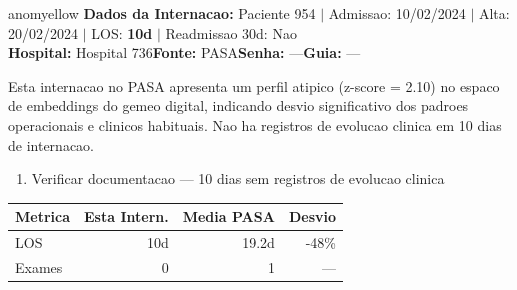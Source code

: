 \documentclass[a4paper,10pt]{article}
\begin{document}
\begin{anomalycard}[Internacao 119574 | PASA | MODERADO (z=2.10)]{anomyellow}
\textbf{Dados da Internacao:} Paciente 954 $\mid$ Admissao: 10/02/2024 $\mid$ Alta: 20/02/2024 $\mid$ LOS: \textbf{10d} $\mid$ Readmissao 30d: Nao\\
\textbf{Hospital:} Hospital 736\quad\textbf{Fonte:} PASA\quad\textbf{Senha:} ---\quad\textbf{Guia:} ---\\
\vspace{2pt}\begin{tcolorbox}[colback=severityred!20,colframe=anomyellow,title={\textbf{Interpretacao de Negocio}},fonttitle=\bfseries\small,left=4pt,right=4pt,top=3pt,bottom=3pt]
{\small Esta internacao no PASA apresenta um perfil atipico (z-score = 2.10) no espaco de embeddings do gemeo digital, indicando desvio significativo dos padroes operacionais e clinicos habituais. Nao ha registros de evolucao clinica em 10 dias de internacao.}
\end{tcolorbox}
\begin{tcolorbox}[colback=severityyellow!30,colframe=anomorange,title={\textbf{Recomendacoes Especificas}},fonttitle=\bfseries\small,left=4pt,right=4pt,top=3pt,bottom=3pt]
\begin{enumerate}[nosep,leftmargin=16pt]
\item {\small Verificar documentacao --- 10 dias sem registros de evolucao clinica}
\end{enumerate}
\end{tcolorbox}
\begin{center}\begin{tabular}{l r r r}\toprule\textbf{Metrica} & \textbf{Esta Intern.} & \textbf{Media PASA} & \textbf{Desvio} \\\midrule
LOS & 10d & 19.2d & -48\% \\
Exames & 0 & 1 & --- \\
\bottomrule\end{tabular}\end{center}


\end{anomalycard}
\end{document}

